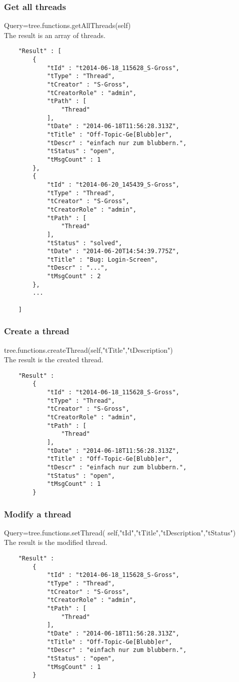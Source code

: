 \documentclass[12pt,a4paper,oneside]{report}
\begin{document}
\subsubsection{Get all threads}
Query=tree.functions.getAllThreads(self)\\
The result is an array of threads.
\begin{lstlisting}
    "Result" : [  
        { 
            "tId" : "t2014-06-18_115628_S-Gross",
            "tType" : "Thread",
            "tCreator" : "S-Gross",
            "tCreatorRole" : "admin",
            "tPath" : [  
                "Thread"
            ],
            "tDate" : "2014-06-18T11:56:28.313Z",
            "tTitle" : "Off-Topic-Ge[Blubb]er",
            "tDescr" : "einfach nur zum blubbern.",
            "tStatus" : "open",
            "tMsgCount" : 1
        },
        { 
            "tId" : "t2014-06-20_145439_S-Gross",
            "tType" : "Thread",
            "tCreator" : "S-Gross",
            "tCreatorRole" : "admin",
            "tPath" : [  
                "Thread"
            ],
            "tStatus" : "solved",
            "tDate" : "2014-06-20T14:54:39.775Z",
            "tTitle" : "Bug: Login-Screen",
            "tDescr" : "...",
            "tMsgCount" : 2
        },
        ...
        
    ]
\end{lstlisting}
\clearpage
\subsubsection{Create a thread}
tree.functions.createThread(self,"tTitle","tDescription")\\
The result is the created thread.
\begin{lstlisting}
    "Result" : 
    	{ 
            "tId" : "t2014-06-18_115628_S-Gross",
            "tType" : "Thread",
            "tCreator" : "S-Gross",
            "tCreatorRole" : "admin",
            "tPath" : [  
                "Thread"
            ],
            "tDate" : "2014-06-18T11:56:28.313Z",
            "tTitle" : "Off-Topic-Ge[Blubb]er",
            "tDescr" : "einfach nur zum blubbern.",
            "tStatus" : "open",
            "tMsgCount" : 1
        }
\end{lstlisting}

\subsubsection{Modify a thread}
Query=tree.functions.setThread( self,"tId","tTitle","tDescription","tStatus")
\\The result is the modified thread.
\begin{lstlisting}
    "Result" : 
    	{ 
            "tId" : "t2014-06-18_115628_S-Gross",
            "tType" : "Thread",
            "tCreator" : "S-Gross",
            "tCreatorRole" : "admin",
            "tPath" : [  
                "Thread"
            ],
            "tDate" : "2014-06-18T11:56:28.313Z",
            "tTitle" : "Off-Topic-Ge[Blubb]er",
            "tDescr" : "einfach nur zum blubbern.",
            "tStatus" : "open",
            "tMsgCount" : 1
        }
\end{lstlisting}
\end{document}
